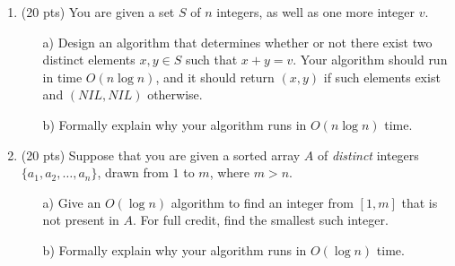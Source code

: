 \documentclass{article}
\begin{document}
\begin{enumerate}
\item (20 pts) You are given a set $S$ of $n$ integers, as well as one more integer $v$. 
\begin{itemize}
\item[a)] Design an algorithm that
determines whether or not there exist two distinct elements $x,y\in S$ such that $x+y=v$. Your algorithm
should run in time $O(n\log n)$, and it should return $(x,y)$ if such elements exist and $(NIL, NIL)$ otherwise.
\item [b)] Formally explain why your algorithm runs in $O(n\log n)$ time.
\end{itemize}

\item (20 pts) Suppose that you are given a sorted array $A$ of {\em distinct} integers $\{a_1, a_2,\dots, a_n\}$,
drawn from $1$ to $m$, where $m>n$. 
\begin{itemize}
\item[a)] Give an $O(\log n)$ algorithm to find an integer from $[1, m]$ that is not 
present in $A$. For full credit, find the smallest such integer. 
\item [b)] Formally explain why your algorithm runs in $O(\log n)$ time.
\end{itemize}

\end{enumerate}
\end{document}
